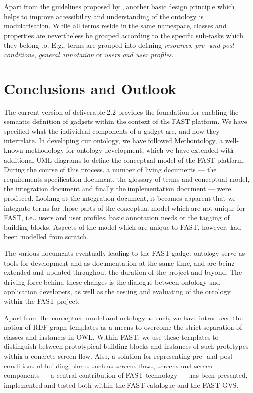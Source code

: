 \documentclass[twoside]{fast_latex}
\newcommand{\todo}[1]{\textsf{\textbf{\textcolor{Orange}{[[TODO: #1]]}}}}
\newcommand{\todo}[1]{}
\begin{document}
Apart from the guidelines proposed by \cite{moeller2009ontology_soft_skills}, another basic design principle which helps to improve accessibility and understanding of the ontology is modularisation. While all terms reside in the same namespace, classes and properties are nevertheless be grouped according to the specific sub-tasks which they belong to. E.g., terms are grouped into defining \emph{resources}, \emph{pre- and post-conditions}, \emph{general annotation} or \emph{users and user profiles}. 



\clearpage
\section{Conclusions and Outlook} %
\label{sec:conclusions}

The current version of deliverable 2.2 provides the foundation for enabling the semantic definition of gadgets within the context of the FAST platform. We have specified what the individual components of a gadget are, and how they interrelate. In developing our ontology, we have followed Methontology, a well-known methodology for ontology development, which we have extended with additional UML diagrams to define the conceptual model of the FAST platform. During the course of this process, a number of living documents --- the requirements specification document, the glossary of terms and conceptual model, the integration document and finally the implementation document --- were produced. 
Looking at the integration document, it becomes apparent that we integrate terms for those parts of the conceptual model which are not unique for FAST, i.e., users and user profiles, basic annotation needs or the tagging of building blocks. Aspects of the model which are unique to FAST, however, had been modelled from scratch.

The various documents eventually leading to the FAST gadget ontology serve as tools for development and as documentation at the same time, and are being extended and updated throughout the duration of the project and beyond. The driving force behind these changes is the dialogue between ontology and application developers, as well as the testing and evaluating of the ontology within the FAST project.

Apart from the conceptual model and ontology as such, we have introduced the notion of RDF graph templates as a means to overcome the strict separation of classes and instances in OWL. Within FAST, we use these templates to distinguish between prototypical building blocks and instances of such prototypes within a concrete screen flow. Also, a solution for representing pre- and post-conditions of building blocks such as screens flows, screens and screen components --- a central contribution of FAST technology --- has been presented, implemented and tested both within the FAST catalogue and the FAST GVS.
\end{document}
